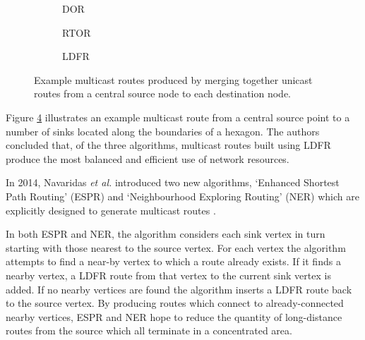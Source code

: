 			\begin{figure}
				\center
				\begin{subfigure}{0.3\linewidth}
					\center
					
					\caption{DOR}
					\label{fig:simple-routers-dor}
				\end{subfigure}
				\begin{subfigure}{0.3\linewidth}
					\center
					
					\caption{RTOR}
					\label{fig:simple-routers-dor}
				\end{subfigure}
				\begin{subfigure}{0.3\linewidth}
					\center
					
					\caption{LDFR}
					\label{fig:simple-routers-dor}
				\end{subfigure}
				
				\caption{Example multicast routes produced by merging together unicast
				routes from a central source node to each destination node.}
				\label{fig:simple-routers}
			\end{figure}
			
			Figure \ref{fig:simple-routers} illustrates an example multicast route
			from a central source point to a number of sinks located along the
			boundaries of a hexagon. The authors concluded that, of the three
			algorithms, multicast routes built using LDFR produce the most balanced
			and efficient use of network resources.
			
			In 2014, Navaridas \emph{et al.} introduced two new algorithms, `Enhanced
			Shortest Path Routing' (ESPR) and `Neighbourhood Exploring Routing' (NER)
			which are explicitly designed to generate multicast routes
			\cite{navaridas14}.
			
			In both ESPR and NER, the algorithm considers each sink vertex in turn
			starting with those nearest to the source vertex. For each vertex the
			algorithm attempts to find a near-by vertex to which a route already
			exists. If it finds a nearby vertex, a LDFR route from that vertex to the
			current sink vertex is added. If no nearby vertices are found the
			algorithm inserts a LDFR route back to the source vertex. By producing
			routes which connect to already-connected nearby vertices, ESPR and NER
			hope to reduce the quantity of long-distance routes from the source which
			all terminate in a concentrated area.
			
